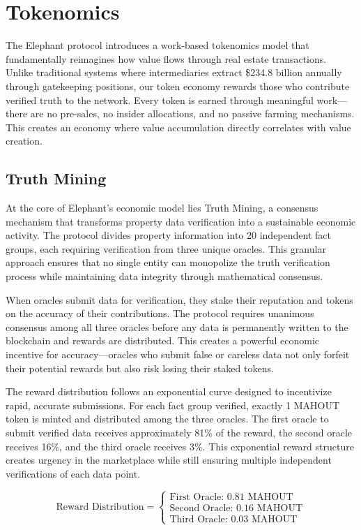 \chapter{Tokenomics}

The Elephant protocol introduces a work-based tokenomics model that fundamentally reimagines how value flows through real estate transactions. Unlike traditional systems where intermediaries extract \$234.8 billion annually through gatekeeping positions, our token economy rewards those who contribute verified truth to the network. Every token is earned through meaningful work—there are no pre-sales, no insider allocations, and no passive farming mechanisms. This creates an economy where value accumulation directly correlates with value creation.

\section{Truth Mining}

At the core of Elephant's economic model lies Truth Mining, a consensus mechanism that transforms property data verification into a sustainable economic activity. The protocol divides property information into 20 independent fact groups, each requiring verification from three unique oracles. This granular approach ensures that no single entity can monopolize the truth verification process while maintaining data integrity through mathematical consensus.

When oracles submit data for verification, they stake their reputation and tokens on the accuracy of their contributions. The protocol requires unanimous consensus among all three oracles before any data is permanently written to the blockchain and rewards are distributed. This creates a powerful economic incentive for accuracy—oracles who submit false or careless data not only forfeit their potential rewards but also risk losing their staked tokens.

The reward distribution follows an exponential curve designed to incentivize rapid, accurate submissions. For each fact group verified, exactly 1 MAHOUT token is minted and distributed among the three oracles. The first oracle to submit verified data receives approximately 81\% of the reward, the second oracle receives 16\%, and the third oracle receives 3\%. This exponential reward structure creates urgency in the marketplace while still ensuring multiple independent verifications of each data point.

\[
\text{Reward Distribution} = \begin{cases}
\text{First Oracle: } 0.81 \text{ MAHOUT} \\
\text{Second Oracle: } 0.16 \text{ MAHOUT} \\
\text{Third Oracle: } 0.03 \text{ MAHOUT}
\end{cases}
\]

